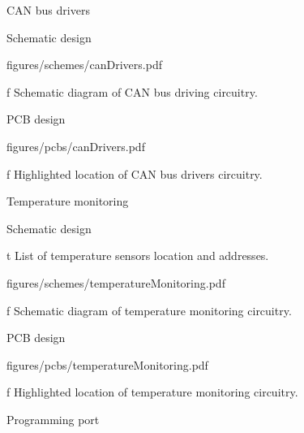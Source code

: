 \sec CAN bus drivers

\secc Schematic design

\midinsert
    \hsize \cinspic figures/schemes/canDrivers.pdf
    \caption/f Schematic diagram of CAN bus driving circuitry.
\endinsert

\secc PCB design

\midinsert
    \hsize \cinspic figures/pcbs/canDrivers.pdf
    \caption/f Highlighted location of CAN bus drivers circuitry.
\endinsert




\sec Temperature monitoring

\secc Schematic design

\midinsert {}
    \caption/t List of temperature sensors location and addresses.
\endinsert

\midinsert
    \hsize \cinspic figures/schemes/temperatureMonitoring.pdf
    \caption/f Schematic diagram of temperature monitoring circuitry.
\endinsert

\secc PCB design

\midinsert
    \hsize \cinspic figures/pcbs/temperatureMonitoring.pdf
    \caption/f Highlighted location of temperature monitoring circuitry.
\endinsert




\sec Programming port

